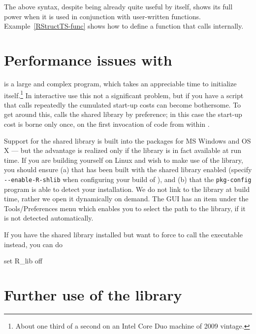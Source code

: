The above syntax, despite being already quite useful by itself, shows
its full power when it is used in conjunction with user-written
functions.  Example~\ref{RStructTS-func} shows how to define a
 function that calls  internally.

\section{Performance issues with }
\label{sec:R-performance}

 is a large and complex program, which takes an appreciable
time to initialize itself.\footnote{About one third of a second on an
  Intel Core Duo machine of 2009 vintage.}  In interactive use this
not a significant problem, but if you have a  script that
calls  repeatedly the cumulated start-up costs can become
bothersome.  To get around this,  calls the  shared
library by preference; in this case the start-up cost is borne only
once, on the first invocation of  code from within .

Support for the  shared library is built into the 
packages for MS Windows and OS X --- but the advantage is realized
only if the library is in fact available at run time.  If you are
building  yourself on Linux and wish to make use of the
 library, you should ensure (a) that  has been built
with the shared library enabled (specify \verb|--enable-R-shlib| when
configuring your build of ), and (b) that the \verb|pkg-config|
program is able to detect your  installation.  We do not link
to the  library at build time, rather we open it dynamically on
demand. The  GUI has an item under the
\textsf{Tools/Preferences} menu which enables you to select the
path to the library, if it is not detected automatically.  

If you have the  shared library installed but want to force
 to call the  executable instead, you can do
\begin{code}
set R_lib off
\end{code}

\section{Further use of the  library}
\label{sec:R-functions}

